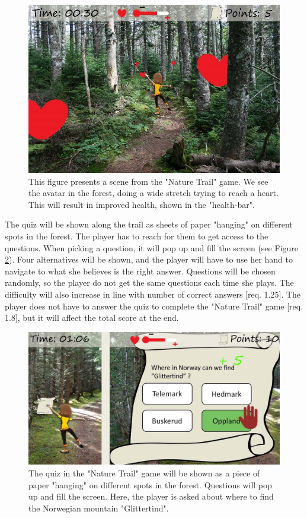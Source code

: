 \begin{figure} [H]
\centering
\includegraphics[scale=0.27]{game1engelsk.jpg}
\caption[Nature trail - stretching]{This figure presents a scene from the "Nature Trail" game. We see the avatar in the forest, doing a wide stretch trying to reach a heart. This will result in improved health, shown in the "health-bar".}
\label{fig:hearts}
\end{figure}

The quiz will be shown along the trail as sheets of paper "hanging" on different spots in the forest. The player has to reach for them to get access to the questions. When picking a question, it will pop up and fill the screen (see Figure \ref{fig:quiz}). Four alternatives will be shown, and the player will have to use her hand to navigate to what she believes is the right answer. Questions will be chosen randomly, so the player do not get the same questions each time she plays. The difficulty will also increase in line with number of correct answers [req. 1.25]. The player does not have to answer the quiz to complete the "Nature Trail" game [req. 1.8], but it will affect the total score at the end. 

\begin{figure} [H]
\centering
\includegraphics[scale=0.25]{quiznyengelsk.jpg}
\caption[Nature trail - quiz]{The quiz in the "Nature Trail" game will be shown as a piece of paper "hanging" on different spots in the forest. Questions will pop up and fill the screen. Here, the player is asked about where to find the Norwegian mountain "Glittertind".}
\label{fig:quiz}
\end{figure} 

